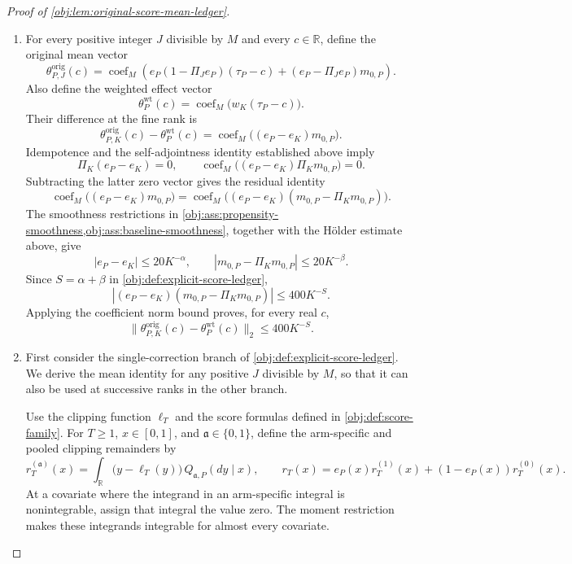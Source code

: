 \documentclass[11pt]{article}
\begin{document}
\begin{proof}[Proof of \cref{obj:lem:original-score-mean-ledger}]
\begin{enumerate}
\item
For every positive integer \(J\) divisible by \(M\) and every \(c\in\mathbb R\), define the original mean vector
\[
\theta^{\mathrm{orig}}_{P,J}(c)
=
\operatorname{coef}_M\!\left(
e_P(1-\Pi_Je_P)(\tau_P-c)
+(e_P-\Pi_Je_P)m_{0,P}
\right).
\]
Also define the weighted effect vector
\[
\theta^{\mathrm{wt}}_P(c)
=
\operatorname{coef}_M\bigl(w_K(\tau_P-c)\bigr).
\]
Their difference at the fine rank is
\[
\theta^{\mathrm{orig}}_{P,K}(c)-\theta^{\mathrm{wt}}_P(c)
=
\operatorname{coef}_M\bigl((e_P-e_K)m_{0,P}\bigr).
\]
Idempotence and the self-adjointness identity established above imply
\[
\Pi_K(e_P-e_K)=0,
\qquad
\operatorname{coef}_M\bigl((e_P-e_K)\Pi_Km_{0,P}\bigr)=0.
\]
Subtracting the latter zero vector gives the residual identity
\[
\operatorname{coef}_M\bigl((e_P-e_K)m_{0,P}\bigr)
=
\operatorname{coef}_M\bigl(
(e_P-e_K)(m_{0,P}-\Pi_Km_{0,P})
\bigr).
\]
The smoothness restrictions in
\cref{obj:ass:propensity-smoothness,obj:ass:baseline-smoothness},
together with the Hölder estimate above, give
\[
|e_P-e_K|\le20K^{-\alpha},
\qquad
|m_{0,P}-\Pi_Km_{0,P}|\le20K^{-\beta}.
\]
Since \(S=\alpha+\beta\) in \cref{obj:def:explicit-score-ledger},
\[
\left|(e_P-e_K)(m_{0,P}-\Pi_Km_{0,P})\right|
\le400K^{-S}.
\]
Applying the coefficient norm bound proves, for every real \(c\),
\[
\|\theta^{\mathrm{orig}}_{P,K}(c)-\theta^{\mathrm{wt}}_P(c)\|_2
\le400K^{-S}.
\]

\item
First consider the single-correction branch of
\cref{obj:def:explicit-score-ledger}. We derive the mean identity for any positive \(J\) divisible by \(M\), so that it can also be used at successive ranks in the other branch.

Use the clipping function \(\ell_T\) and the score formulas defined in \cref{obj:def:score-family}. For \(T\ge1\), \(x\in[0,1]\), and \(\mathfrak a\in\{0,1\}\), define the arm-specific and pooled clipping remainders by
\[
r_T^{(\mathfrak a)}(x)
=
\int_{\mathbb R}\bigl(y-\ell_T(y)\bigr)
\,Q_{\mathfrak a,P}(dy\mid x),
\qquad
r_T(x)
=
e_P(x)r_T^{(1)}(x)+(1-e_P(x))r_T^{(0)}(x).
\]
At a covariate where the integrand in an arm-specific integral is nonintegrable, assign that integral the value zero. The moment restriction makes these integrands integrable for almost every covariate.


\end{enumerate}
\end{proof}
\end{document}
